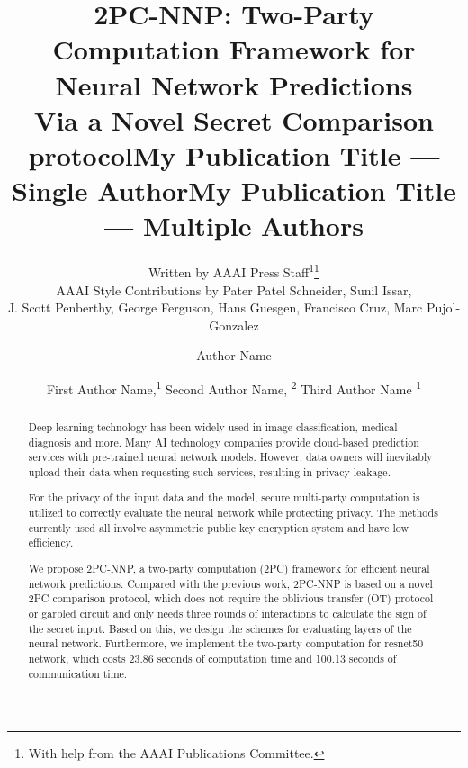 \documentclass[letterpaper]{article} %
\title{2PC-NNP: Two-Party Computation Framework for Neural Network Predictions \\ Via a Novel Secret Comparison protocol}
\author{
    Written by AAAI Press Staff\textsuperscript{\rm 1}\thanks{With help from the AAAI Publications Committee.}\\
    AAAI Style Contributions by Pater Patel Schneider,
    Sunil Issar,\\
    J. Scott Penberthy,
    George Ferguson,
    Hans Guesgen,
    Francisco Cruz\equalcontrib,
    Marc Pujol-Gonzalez\equalcontrib
}
\title{My Publication Title --- Single Author}
\author {
    Author Name
}
\title{My Publication Title --- Multiple Authors}
\author {
    First Author Name,\textsuperscript{\rm 1}
    Second Author Name, \textsuperscript{\rm 2}
    Third Author Name \textsuperscript{\rm 1}
}
\begin{document}
\maketitle

\begin{abstract}

    Deep learning technology has been widely used in image classification, medical diagnosis and more. 
    Many AI technology companies provide cloud-based prediction services with pre-trained neural network models. 
    However, data owners will inevitably upload their data  
    when requesting such services, resulting in privacy leakage.


    For the privacy of the input data and the model, 
    secure multi-party computation is utilized
    to correctly evaluate the neural network while protecting privacy. 
    The methods currently used all involve asymmetric public key encryption system and have low efficiency.

    We propose 2PC-NNP, a two-party computation (2PC) framework for efficient neural network predictions.%
    Compared with the previous work, 2PC-NNP is based on a novel 2PC comparison protocol, 
    which does not require the oblivious transfer (OT) protocol or garbled circuit 
    and only needs three rounds of interactions to calculate the sign of the secret input. 
    Based on this, we design the schemes for evaluating layers of the neural network. 
    Furthermore, we implement the two-party computation for resnet50 network, 
    which costs 23.86 seconds of computation time and 100.13 seconds of communication time.
    
    


\end{abstract}
    
\end{document}
